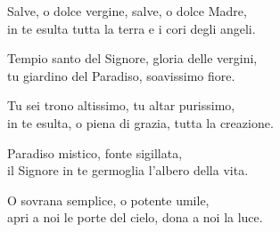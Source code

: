 
\strofa Salve, o dolce vergine, salve, o dolce  Madre,\\
in te esulta tutta la terra e i cori degli angeli.

\spazio

\strofa Tempio santo del Signore, gloria delle vergini,\\
tu giardino del Paradiso, soavissimo fiore.

\spazio

\strofa Tu sei trono altissimo, tu altar purissimo,\\
in te esulta, o piena di grazia, tutta la creazione.

\spazio

\strofa Paradiso mistico, fonte sigillata,\\
il Signore in te germoglia l'albero della vita.

\spazio

\strofa O sovrana semplice, o potente umile,\\
apri a noi le porte del cielo, dona a noi la luce.